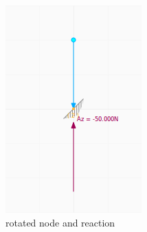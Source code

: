 \documentclass[a4paper,11pt]{report}
\begin{document}
\begin{minipage}[h]{0.3\textwidth}
\begin{figure}[H]
\begin{center}
\includegraphics[width=\textwidth]{../pictures/reactionrotated.png}
\caption{rotated node and reaction}
\label{pic:reactionrotated}
\end{center}
\end{figure}
\end{minipage}
\end{document}
